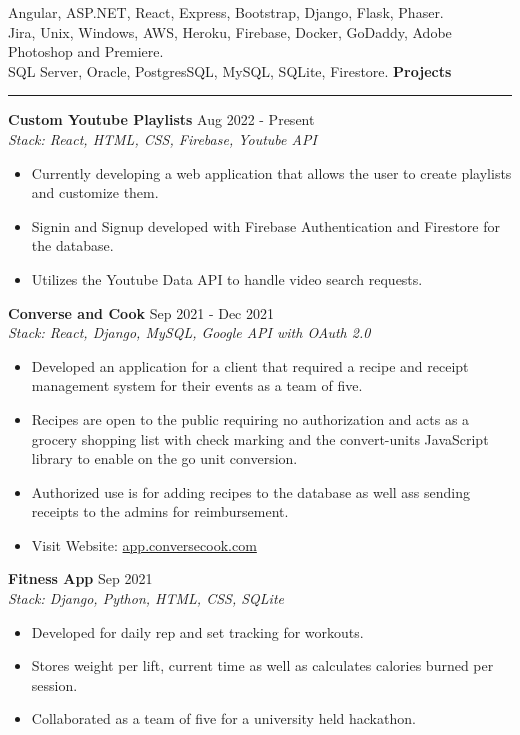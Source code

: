 \documentclass{article}
\begin{document}
	 Angular, ASP.NET, React, Express, Bootstrap, Django, Flask, Phaser.\\
	 Jira, Unix, Windows, AWS, Heroku, Firebase, Docker, GoDaddy, Adobe Photoshop and Premiere. \\
	 SQL Server, Oracle, PostgresSQL, MySQL, SQLite, Firestore.
\vspace{2mm}
\hfill\break
\noindent \textbf{Projects}
\vspace{1mm}
\hrule
\vspace{1mm}
\hfill\break
 \textbf {Custom Youtube Playlists} \hfill Aug 2022 - Present \\
\textit {Stack: React, HTML, CSS, Firebase, Youtube API}
\begin{itemize}[noitemsep, nolistsep]
	\item {Currently developing a web application that allows the user to create playlists and customize them.}
	\item {Signin and Signup developed with Firebase Authentication and Firestore for the database.}
	\item {Utilizes the Youtube Data API to handle video search requests.}
\end{itemize}

\noindent \textbf {Converse and Cook} \hfill Sep 2021 - Dec 2021 \\
\textit {Stack: React, Django, MySQL, Google API with OAuth 2.0}
\begin{itemize}[noitemsep, nolistsep]
	\item {Developed an application for a client that required a recipe and receipt management system for their events as a team of five.}
	\item {Recipes are open to the public requiring no authorization and acts as a grocery shopping list with check marking and the convert-units JavaScript library to enable on the go unit conversion.}
	\item{Authorized use is for adding recipes to the database as well ass sending receipts to the admins for reimbursement.}
	\item {Visit Website:
	\href{http://app.conversecook.com}{app.conversecook.com}
	}
\end{itemize}

\noindent \textbf {Fitness App} \hfill Sep 2021 \\
\textit {Stack: Django, Python, HTML, CSS, SQLite}
\begin{itemize}[noitemsep, nolistsep]
	\item {Developed for daily rep and set tracking for workouts.}
	\item {Stores weight per lift, current time as well as calculates calories burned per session.}
	\item {Collaborated as a team of five for a university held hackathon.}
\end{itemize}
\end{document}
